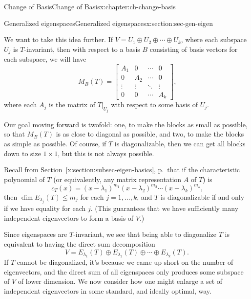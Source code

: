 \documentclass[oneside,10pt,]{book}
\newcommand{\xreffont}{\relax}
\numberwithin{equation}{section}
\newcommand{\bbm}{\begin{bmatrix}}
\newcommand{\ebm}{\end{bmatrix}}
\newcommand{\amp}{&}
\begin{document}
\begin{chapterptx}{Change of Basis}{}{Change of Basis}{}{}{x:chapter:ch-change-basis}
\begin{sectionptx}{Generalized eigenspaces}{}{Generalized eigenspaces}{}{}{x:section:sec-gen-eigen}
\par
We want to take this idea further. If \(V = U_1\oplus U_2\oplus \cdots \oplus U_k\), where each subspace \(U_j\) is \(T\)-invariant, then with respect to a basis \(B\) consisting of basis vectors for each subspace, we will have%
\begin{equation*}
M_B(T)=\bbm A_1 \amp 0 \amp \cdots \amp 0\\
0 \amp A_2 \amp \cdots \amp 0\\
\vdots \amp \vdots \amp \ddots \amp \vdots\\
0 \amp 0 \amp \cdots \amp A_k\ebm\text{,}
\end{equation*}
where each \(A_j\) is the matrix of \(T|_{U_j}\) with respect to some basis of \(U_j\).%
\par
Our goal moving forward is twofold: one, to make the blocks as small as possible, so that \(M_B(T)\) is as close to diagonal as possible, and two, to make the blocks as simple as possible. Of course, if \(T\) is diagonalizable, then we can get all blocks down to size \(1\times 1\), but this is not always possible.%
\par
Recall from \hyperref[x:section:subsec-eigen-basics]{Section~{\xreffont\ref{x:section:subsec-eigen-basics}}, p.\,\pageref{x:section:subsec-eigen-basics}} that if the characteristic polynomial of \(T\) (or equivalently, any matrix representation \(A\) of \(T\)) is%
\begin{equation*}
c_T(x) = (x-\lambda_1)^{m_1}(x-\lambda_2)^{m_2}\cdots (x-\lambda_k)^{m_k}\text{,}
\end{equation*}
then \(\dim E_{\lambda_j}(T)\leq m_j\) for each \(j=1,\ldots, k\), and \(T\) is diagonalizable if and only if we have equality for each \(j\). (This guarantees that we have sufficiently many independent eigenvectors to form a basis of \(V\).)%
\par
Since eigenspaces are \(T\)-invariant, we see that being able to diagonalize \(T\) is equivalent to having the direct sum decomposition%
\begin{equation*}
V = E_{\lambda_1}(T)\oplus E_{\lambda_2}(T)\oplus \cdots \oplus E_{\lambda_k}(T)\text{.}
\end{equation*}
If \(T\) cannot be diagonalized, it's because we came up short on the number of eigenvectors, and the direct sum of all eigenspaces only produces some subspace of \(V\) of lower dimension. We now consider how one might enlarge a set of independent eigenvectors in some standard, and ideally optimal, way.%
\par

\end{sectionptx}
\end{chapterptx}
\end{document}
